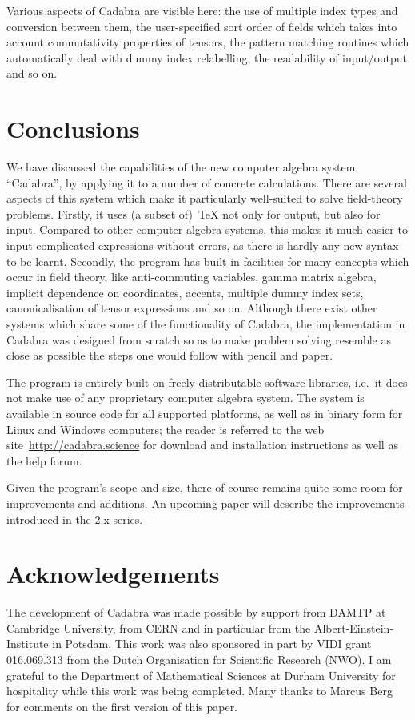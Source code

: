 \documentclass[11pt]{article}
\newcommand{\Cdb}{{Cadabra}\xspace}
\begin{document}
Various aspects of \Cdb are visible here: the use of multiple
index types and conversion between them, the user-specified sort order
of fields which takes into account commutativity properties of
tensors, the pattern matching routines which automatically deal with dummy
index relabelling, the readability of input/output and so on. 


\section{Conclusions}

We have discussed the capabilities of the new computer algebra system
``\Cdb'', by applying it to a number of concrete calculations. There are
several aspects of this system which make it particularly well-suited
to solve field-theory problems. Firstly, it uses (a subset of)~\TeX{}
not only for output, but also for input. Compared to other computer
algebra systems, this makes it much easier to input complicated
expressions without errors, as there is hardly any new syntax to be
learnt. Secondly, the program has built-in facilities for many
concepts which occur in field theory, like anti-commuting variables,
gamma matrix algebra, implicit dependence on coordinates, accents,
multiple dummy index sets, canonicalisation of tensor expressions and
so on. Although there exist other systems which share some of the
functionality of \Cdb, the implementation in \Cdb was designed from
scratch so as to make problem solving resemble as close as possible
the steps one would follow with pencil and paper.

The program is entirely built on freely distributable software
libraries, i.e.~it does not make use of any proprietary computer
algebra system.  The system is available in source code for all
supported platforms, as well as in binary form for Linux and Windows
computers; the reader is referred to the web
site~\url{http://cadabra.science} for download and installation
instructions as well as the help forum.

Given the program's scope and size, there of course remains quite some
room for improvements and additions. An upcoming paper will describe
the improvements introduced in the 2.x series.
\vfill\eject

\section*{Acknowledgements}

The development of Cadabra was made possible by support from
DAMTP at Cambridge University, from CERN and in particular from the
Albert-Einstein-Institute in Potsdam.  This work was also sponsored in
part by VIDI grant 016.069.313 from the Dutch Organisation for
Scientific Research (NWO).  I am grateful to the Department of
Mathematical Sciences at Durham University for hospitality while this
work was being completed. Many thanks to Marcus Berg for comments on
the first version of this paper.
\end{document}
